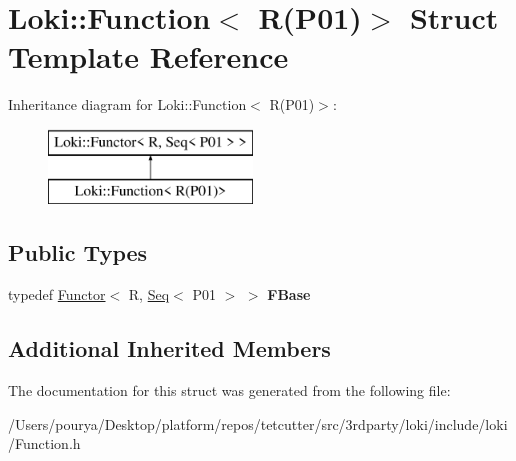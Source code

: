 \hypertarget{structLoki_1_1Function_3_01R_07P01_08_4}{}\section{Loki\+:\+:Function$<$ R(P01)$>$ Struct Template Reference}
\label{structLoki_1_1Function_3_01R_07P01_08_4}
Inheritance diagram for Loki\+:\+:Function$<$ R(P01)$>$\+:\begin{figure}[H]
\begin{center}
\leavevmode
\includegraphics[height=2.000000cm]{structLoki_1_1Function_3_01R_07P01_08_4}
\end{center}
\end{figure}
\subsection*{Public Types}
\begin{DoxyCompactItemize}
\item 
\hypertarget{structLoki_1_1Function_3_01R_07P01_08_4_aee1c6dd837cecd5779bd13e9a9c203ef}{}typedef \hyperlink{classLoki_1_1Functor}{Functor}$<$ R, \hyperlink{structLoki_1_1Seq}{Seq}$<$ P01 $>$ $>$ {\bfseries F\+Base}\label{structLoki_1_1Function_3_01R_07P01_08_4_aee1c6dd837cecd5779bd13e9a9c203ef}

\end{DoxyCompactItemize}
\subsection*{Additional Inherited Members}


The documentation for this struct was generated from the following file\+:\begin{DoxyCompactItemize}
\item 
/\+Users/pourya/\+Desktop/platform/repos/tetcutter/src/3rdparty/loki/include/loki/Function.\+h\end{DoxyCompactItemize}
